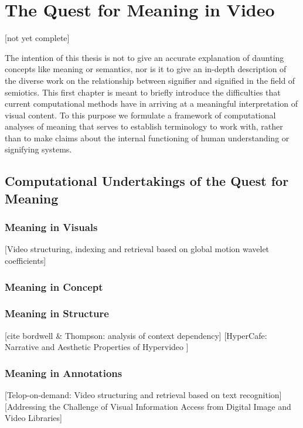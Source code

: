 \chapter{The Quest for Meaning in Video}
\label{ch:quest}

[not yet complete]

The intention of this thesis is not to give an accurate explanation of daunting concepts like meaning or semantics, nor is it to give an in-depth description of the diverse work on the relationship between signifier and signified in the field of semiotics. This first chapter is meant to briefly introduce the difficulties that current computational methods have in arriving at a meaningful interpretation of visual content. To this purpose we formulate a framework of computational analyses of meaning that serves to establish terminology to work with, rather than to make claims about the internal functioning of human understanding or signifying systems.

\section{Computational Undertakings of the Quest for Meaning}

\subsection{Meaning in Visuals}
[Video structuring, indexing and retrieval based on global motion wavelet coefficients]\cite{Bruno:2002tt}

\subsection{Meaning in Concept}
\subsection{Meaning in Structure}
[cite bordwell \& Thompson: analysis of context dependency]
[HyperCafe: Narrative and Aesthetic Properties of Hypervideo \cite{Sawhney:1996tk}]

\subsection{Meaning in Annotations}
[Telop-on-demand: Video structuring and retrieval based on text recognition]\cite{Kuwano:2000wy}
[Addressing the Challenge of Visual Information Access from Digital Image and Video Libraries]\cite{Christel:2005td}

